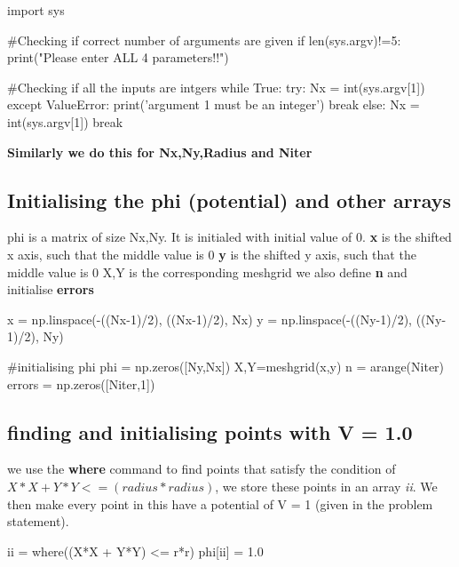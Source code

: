 \documentclass[11pt]{article}
\begin{document}
\begin{python}
import sys

#Checking if correct number of arguments are given
if len(sys.argv)!=5:
	print("Please enter ALL 4 parameters!!")

#Checking if all the inputs are intgers
while True:
	try:
		Nx = int(sys.argv[1])       
	except ValueError:
		print('argument 1 must be an integer')
		break
	else:
		Nx = int(sys.argv[1])
		break 
		
\textbf{Similarly we do this for Nx,Ny,Radius and Niter}
\end{python}

\subsection{Initialising the phi (potential) and other arrays}
phi is a matrix of size Nx,Ny. It is initialed with initial value of 0.
\textbf{x} is the shifted x axis, such that the middle value is 0
\textbf{y} is the shifted y axis, such that the middle value is 0
X,Y is the corresponding meshgrid
we also define \textbf{n} and initialise \textbf{errors}

\begin{python}
x = np.linspace(-((Nx-1)/2), ((Nx-1)/2), Nx)
y = np.linspace(-((Ny-1)/2), ((Ny-1)/2), Ny) 

#initialising phi
phi = np.zeros([Ny,Nx])
X,Y=meshgrid(x,y)
n = arange(Niter)
errors = np.zeros([Niter,1])
\end{python}

\subsection{finding and initialising points with V = 1.0}
we use the \textbf{where} command to find points that satisfy the condition of $X*X +Y*Y <= (radius * radius)$, we store these points in an array \textit{ii}. We then make every point in this have a potential of V = 1 (given in the problem statement).

\begin{python}
ii = where((X*X + Y*Y) <= r*r)
phi[ii] = 1.0
\end{python}
\end{document}
